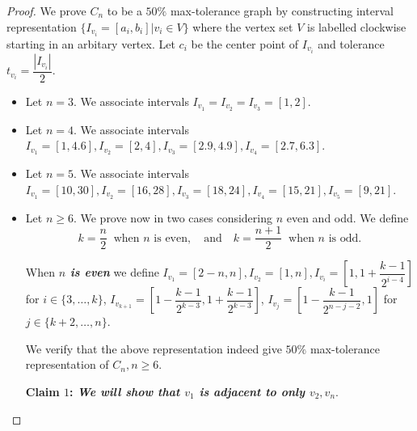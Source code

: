 \documentclass{article}
\theoremstyle{definition}
\numberwithin{equation}{section}
\begin{document}
\begin{proof}
We prove $C_{n}$ to be a $50\%$ max-tolerance graph by constructing interval representation $\{I_{v_{i}}=[a_{i},b_{i}]|v_{i}\in V\}$ where the vertex set $V$ is labelled clockwise starting in an arbitary vertex.
Let $c_{i}$ be the center point of $I_{v_{i}}$ and tolerance $t_{v_{i}}=\dfrac{|I_{v_{i}}|}{2}$. 
 
\begin{itemize}
\item Let $n=3$. We associate intervals $I_{v_{1}}=I_{v_{2}}=I_{v_{3}}=[1,2]$.
\item Let $n=4$. We associate intervals $I_{v_{1}}=[1,4.6],I_{v_{2}}=[2,4],I_{v_{3}}=[2.9,4.9],I_{v_{4}}=[2.7,6.3]$.
\item Let $n=5$. We associate intervals $I_{v_{1}}=[10,30],I_{v_{2}}=[16,28],I_{v_{3}}=[18,24],I_{v_{4}}=[15,21],I_{v_{5}}=[9,21]$.
\item Let $n\geq 6$. We prove now in two cases considering $n$ even and odd. We define
$$k=\dfrac{n}{2}\ \text{ when } n \text{ is even},\quad \text{and}\quad k=\dfrac{n+1}{2}\ \text{ when }n \text{ is odd.}$$

\noindent When \textbf{\emph{$n$ is even}} we define $I_{v_{1}}=[2-n,n], I_{v_{2}}=[1,n], I_{v_{i}}=[1,1+\dfrac{k-1}{2^{i-4}}]$ for $i\in\{3,\hdots,k\}$, $I_{v_{k+1}}=[1-\dfrac{k-1}{2^{k-3}},1+\dfrac{k-1}{2^{k-3}}]$, $I_{v_{j}}=[1-\dfrac{k-1}{2^{n-j-2}},1]$ for $j\in\{k+2,\hdots,n\}$.

\noindent We verify that the above representation indeed give $50\%$ max-tolerance representation of $C_{n},n\geq 6$.

\noindent\textbf{Claim $1$: \textit{We will show that $v_{1}$ is adjacent to only $v_{2},v_{n}$}}.


\end{itemize}
\end{proof}
\end{document}
